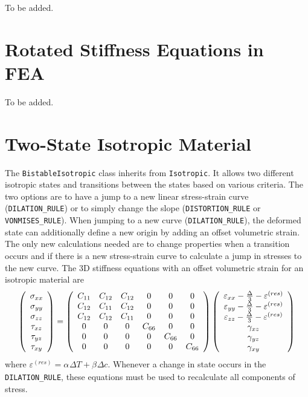 \documentclass[11pt]{book}
\def\a#1{\alpha_{#1}}
\def\b#1{\beta_{#1}}
\def\code#1{{\small\tt #1}}
\def\DT{\Delta T}
\def\e#1{\varepsilon_{#1}}
\def\er#1{\varepsilon_{#1}^{(res)}}
\def\g#1{\gamma_{#1}}
\def\s#1{\sigma_{#1}}
\def\t#1{\tau_{#1}}
\begin{document}
To be added.

\section{Rotated Stiffness Equations in FEA}

To be added.

\section{Two-State Isotropic Material}

The \code{BistableIsotropic} class inherits from \code{Isotropic}. It allows two different isotropic states and transitions  between the states based on various criteria. The two options are to have a jump to a new linear stress-strain curve (\code{DILATION\_RULE}) or to simply change the slope (\code{DISTORTION\_RULE} or \code{VONMISES\_RULE}). When jumping to a new curve (\code{DILATION\_RULE}), the deformed state can additionally define a new origin by adding an offset volumetric strain. The only new calculations needed are to change properties when a transition occurs and if there is a new stress-strain curve to calculate a jump in stresses to the new curve. The 3D stiffness equations with an offset volumetric strain for an isotropic material are
\begin{equation}
     \left(\begin{array}{c} \s{xx} \\ \s{yy} \\ \s{zz} \\ \t{xz} \\ \t{yz} \\ \t{xy} \end{array}\right)
       =  \left(\begin{array}{cccccc}
      C_{11} & C_{12} & C_{12} & 0 & 0 & 0 \\
      C_{12} & C_{11} & C_{12} & 0 & 0 & 0 \\
      C_{12} & C_{12} & C_{11} & 0 & 0 & 0 \\
      0 & 0 & 0 & C_{66} & 0 & 0 \\
      0 & 0 & 0 & 0 & C_{66} & 0  \\
      0 & 0 & 0 & 0 & 0 &  C_{66}  \end{array}\right)
     \left(\begin{array}{c} \e{xx} - {\Delta\over 3} -\er{}\\ \e{yy} - {\Delta\over 3} -\er{}\\ 
                   \e{zz} - {\Delta\over 3} - \er{}\\ 
                   \g{xz} \\ \g{yz} \\ \g{xy} \end{array}\right)
\end{equation}
where $\er{}=\a{}\DT+\b{}\Delta c$.
Whenever a change in state occurs in the \code{DILATION\_RULE}, these equations must be used to recalculate all components of stress.
\end{document}
